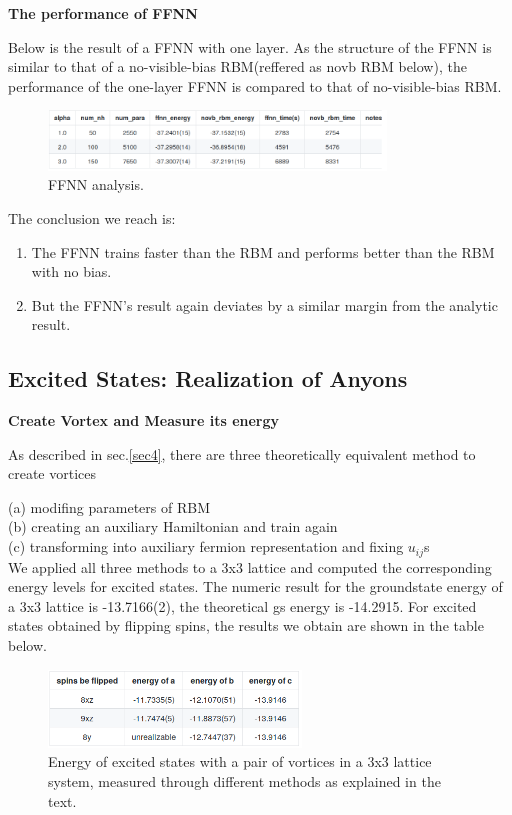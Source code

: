 \documentclass{article}
\begin{document}
\textbf{The performance of FFNN}

Below is the result of a FFNN with one layer. As the structure of the FFNN is similar to that of a no-visible-bias RBM(reffered as novb RBM below), the performance of the one-layer FFNN is compared to that of no-visible-bias RBM.

\begin{figure}[!htb]
	\centering
	\includegraphics[width=0.8\textwidth]{./images/ffnn.png}
	\caption{\label{tab:ffnn} FFNN analysis.} 
\end{figure}    

The conclusion we reach is:
\begin{enumerate}
	\item The FFNN trains faster than the RBM and performs better than the RBM with no bias.
	\item But the FFNN's result again deviates by a similar margin from the analytic result.
\end{enumerate}

\subsection{Excited States: Realization of Anyons}

\textbf{Create Vortex and Measure its energy}

As described in sec.\hspace{0.2mm}\ref{sec4}, there are three theoretically equivalent method to create vortices

    (a) modifing parameters of RBM \\
    (b) creating an auxiliary Hamiltonian and train again \\
    (c) transforming into auxiliary fermion representation and fixing $u_{ij}$s \cite{Kitaev_2003} \cite{pachos_2012}\\
    
We applied all three methods to a 3x3 lattice and computed the corresponding energy levels for excited states. The numeric result for the groundstate energy of a 3x3 lattice is -13.7166(2), the theoretical gs energy is -14.2915. For excited states obtained by flipping spins, the results we obtain are shown in the table below.

\begin{figure}[!htb]
	\centering
	\includegraphics[width=0.6\textwidth]{./images/3x3.png}
	\caption{\label{tab:3x3} Energy of excited states with a pair of vortices in a 3x3 lattice system, measured through different methods as explained in the text.} 
\end{figure}
\end{document}
